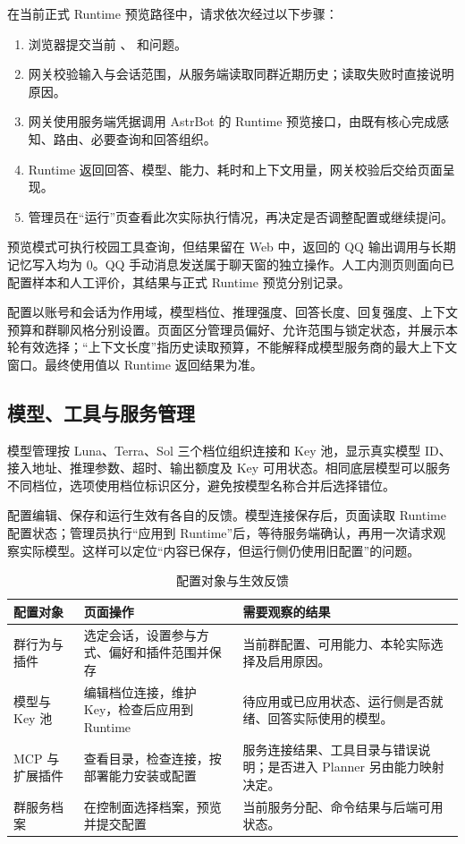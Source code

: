在当前正式 Runtime 预览路径中，请求依次经过以下步骤：
\begin{enumerate}
\item 浏览器提交当前 、 和问题。
\item 网关校验输入与会话范围，从服务端读取同群近期历史；读取失败时直接说明原因。
\item 网关使用服务端凭据调用 AstrBot 的 Runtime 预览接口，由既有核心完成感知、路由、必要查询和回答组织。
\item Runtime 返回回答、模型、能力、耗时和上下文用量，网关校验后交给页面呈现。
\item 管理员在“运行”页查看此次实际执行情况，再决定是否调整配置或继续提问。
\end{enumerate}

预览模式可执行校园工具查询，但结果留在 Web 中，返回的 QQ 输出调用与长期记忆写入均为 0。QQ 手动消息发送属于聊天窗的独立操作。人工内测页则面向已配置样本和人工评价，其结果与正式 Runtime 预览分别记录。

配置以账号和会话为作用域，模型档位、推理强度、回答长度、回复强度、上下文预算和群聊风格分别设置。页面区分管理员偏好、允许范围与锁定状态，并展示本轮有效选择；“上下文长度”指历史读取预算，不能解释成模型服务商的最大上下文窗口。最终使用值以 Runtime 返回结果为准。

\subsection{模型、工具与服务管理}
模型管理按 Luna、Terra、Sol 三个档位组织连接和 Key 池，显示真实模型 ID、接入地址、推理参数、超时、输出额度及 Key 可用状态。相同底层模型可以服务不同档位，选项使用档位标识区分，避免按模型名称合并后选择错位。

配置编辑、保存和运行生效有各自的反馈。模型连接保存后，页面读取 Runtime 配置状态；管理员执行“应用到 Runtime”后，等待服务端确认，再用一次请求观察实际模型。这样可以定位“内容已保存，但运行侧仍使用旧配置”的问题。

\begin{table}[H]\centering
\caption{配置对象与生效反馈}
\begin{tabularx}{\textwidth}{@{}L{28mm}Y Y@{}}\toprule
配置对象 & 页面操作 & 需要观察的结果\\\midrule
群行为与插件 & 选定会话，设置参与方式、偏好和插件范围并保存 & 当前群配置、可用能力、本轮实际选择及启用原因。\\
模型与 Key 池 & 编辑档位连接，维护 Key，检查后应用到 Runtime & 待应用或已应用状态、运行侧是否就绪、回答实际使用的模型。\\
MCP 与扩展插件 & 查看目录，检查连接，按部署能力安装或配置 & 服务连接结果、工具目录与错误说明；是否进入 Planner 另由能力映射决定。\\
群服务档案 & 在控制面选择档案，预览并提交配置 & 当前服务分配、命令结果与后端可用状态。\\\bottomrule
\end{tabularx}
\end{table}

